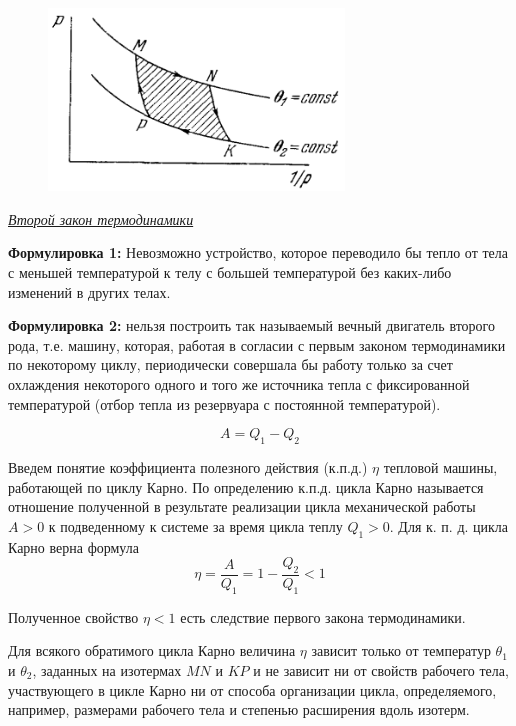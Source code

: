 \begin{figure}[H]
\includegraphics[width=0.7\textwidth]{10/carno.png}
\end{figure}


\begin{center}
	\textit{\underline{Второй закон термодинамики}}
\end{center}

\textbf{Формулировка 1:} Невозможно устройство, которое переводило бы тепло от тела с меньшей температурой к телу с большей температурой без каких-либо изменений в других телах.

\textbf{Формулировка 2:} нельзя построить так называемый вечный двигатель второго рода, т.е. машину,  которая,  работая в согласии с первым законом термодинамики по некоторому циклу,  периодически совершала бы работу только за счет охлаждения некоторого одного и того же источника тепла с фиксированной температурой (отбор тепла из резервуара с постоянной температурой).

$$ A = Q_1 - Q_2 $$

Введем понятие коэффициента полезного действия (к.п.д.) $\eta$ тепловой машины, работающей по циклу Карно. По определению к.п.д.  цикла Карно называется отношение полученной в результате реализации цикла механической работы $A > 0$ к подведенному к системе за время цикла теплу $Q_1 > 0$.  Для к. п. д. цикла Карно верна формула
$$ \eta = \frac{A}{Q_1} = 1 - \frac{Q_2}{Q_1} < 1 $$

Полученное свойство $\eta < 1$ есть следствие первого закона термодинамики. 

\begin{state}
	Для всякого обратимого цикла Карно величина $\eta$ зависит только от температур $\theta_1$ и $\theta_2$,  заданных на изотермах $MN$ и $KP$ и не зависит ни от свойств рабочего тела, участвующего в цикле Карно ни от способа организации цикла, определяемого, например, размерами рабочего тела и степенью расширения вдоль изотерм.
\end{state}

